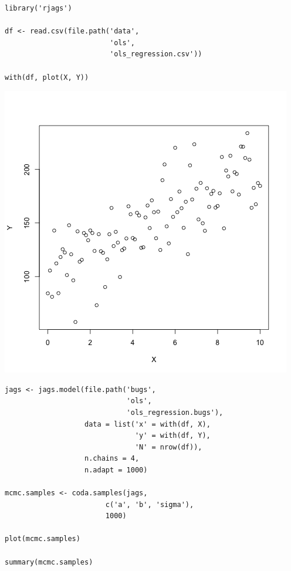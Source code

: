 \documentclass{beamer}
\begin{document}
\begin{frame}[fragile]
  \begin{verbatim}
library('rjags')

df <- read.csv(file.path('data',
                         'ols',
                         'ols_regression.csv'))

with(df, plot(X, Y))
  \end{verbatim}
\end{frame}

\begin{frame}[fragile]
  \begin{center}
    \includegraphics[scale = 0.4]{../graphs/ols/data_plot.png}
  \end{center}
\end{frame}

\begin{frame}[fragile]
  \begin{verbatim}
jags <- jags.model(file.path('bugs',
                             'ols',
                             'ols_regression.bugs'),
                   data = list('x' = with(df, X),
                               'y' = with(df, Y),
                               'N' = nrow(df)),
                   n.chains = 4,
                   n.adapt = 1000)
 
mcmc.samples <- coda.samples(jags,
                        c('a', 'b', 'sigma'),
                        1000)

plot(mcmc.samples)

summary(mcmc.samples)
  \end{verbatim}
\end{frame}
\end{document}
